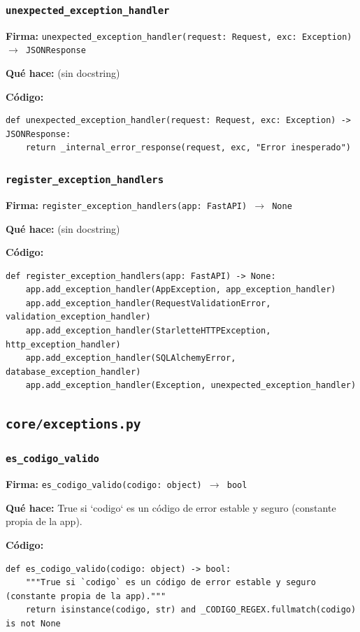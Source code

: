 \documentclass[11pt,a4paper]{article}
\begin{document}
\subsubsection*{\texttt{unexpected\_exception\_handler}}
\textbf{Firma:} \texttt{unexpected\_exception\_handler(request: Request, exc: Exception) $\rightarrow$ JSONResponse}

\textbf{Qué hace:} (sin docstring)

\textbf{Código:}
\begin{lstlisting}
def unexpected_exception_handler(request: Request, exc: Exception) -> JSONResponse:
    return _internal_error_response(request, exc, "Error inesperado")
\end{lstlisting}

\subsubsection*{\texttt{register\_exception\_handlers}}
\textbf{Firma:} \texttt{register\_exception\_handlers(app: FastAPI) $\rightarrow$ None}

\textbf{Qué hace:} (sin docstring)

\textbf{Código:}
\begin{lstlisting}
def register_exception_handlers(app: FastAPI) -> None:
    app.add_exception_handler(AppException, app_exception_handler)
    app.add_exception_handler(RequestValidationError, validation_exception_handler)
    app.add_exception_handler(StarletteHTTPException, http_exception_handler)
    app.add_exception_handler(SQLAlchemyError, database_exception_handler)
    app.add_exception_handler(Exception, unexpected_exception_handler)
\end{lstlisting}

\subsection{\texttt{core/exceptions.py}}

\subsubsection*{\texttt{es\_codigo\_valido}}
\textbf{Firma:} \texttt{es\_codigo\_valido(codigo: object) $\rightarrow$ bool}

\textbf{Qué hace:} True si `codigo` es un código de error estable y seguro (constante propia de la app).

\textbf{Código:}
\begin{lstlisting}
def es_codigo_valido(codigo: object) -> bool:
    """True si `codigo` es un código de error estable y seguro (constante propia de la app)."""
    return isinstance(codigo, str) and _CODIGO_REGEX.fullmatch(codigo) is not None
\end{lstlisting}
\end{document}
